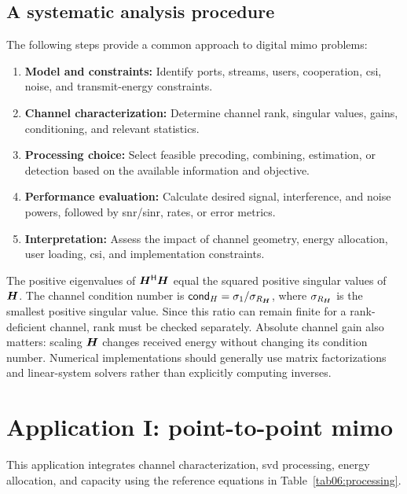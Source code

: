 \subsection{A systematic analysis procedure}
The following steps provide a common approach to digital \ac{mimo} problems:
\begin{enumerate}[label=\textbf{\arabic*.}]
	\item \textbf{Model and constraints:} Identify ports, streams, users, cooperation, \ac{csi}, noise, and transmit-energy constraints.
	\item \textbf{Channel characterization:} Determine channel rank, singular values, gains, conditioning, and relevant statistics.
	\item \textbf{Processing choice:} Select feasible precoding, combining, estimation, or detection based on the available information and objective.
	\item \textbf{Performance evaluation:} Calculate desired signal, interference, and noise powers, followed by \ac{snr}/\ac{sinr}, rates, or error metrics.
	\item \textbf{Interpretation:} Assess the impact of channel geometry, energy allocation, user loading, \ac{csi}, and implementation constraints.
\end{enumerate}
The positive eigenvalues of ${\bm{H}}^{\mathsf{H}}\bm{H}$ equal the squared positive singular values of $\bm{H}$. The channel condition number is $\mathsf{cond}_H=\sigma_1/\sigma_{R_{\bm{H}}}$, where $\sigma_{R_{\bm{H}}}$ is the smallest positive singular value. Since this ratio can remain finite for a rank-deficient channel, rank must be checked separately. Absolute channel gain also matters: scaling $\bm{H}$ changes received energy without changing its condition number. Numerical implementations should generally use matrix factorizations and linear-system solvers rather than explicitly computing inverses.



\section{Application I: point-to-point \ac{mimo}}
\label{sec06:p2p}
This application integrates channel characterization, \ac{svd} processing, energy allocation, and capacity using the reference equations in Table~\ref{tab06:processing}.

